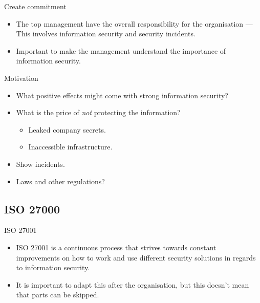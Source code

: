 \documentclass{beamer}
\begin{document}
\begin{frame}{Create commitment}
  \begin{itemize}
    \item The top management have the overall responsibility for the
      organisation --- This involves information security and security incidents.
    \item Important to make the management understand the importance of
      information security.
  \end{itemize}
\end{frame}

\begin{frame}{Motivation}
  \begin{itemize}
    \item What positive effects might come with strong information security?
    \item What is the price of \emph{not} protecting the information?
      \begin{itemize}
        \item Leaked company secrets.
        \item Inaccessible infrastructure.
      \end{itemize}
    \item Show incidents.
    \item Laws and other regulations?
  \end{itemize}
\end{frame}

\subsection{ISO 27000}
\begin{frame}{ISO 27001}
  \begin{itemize}
    \item ISO 27001 is a continuous process that strives towards constant
      improvements on how to work and use different security solutions in
      regards to information security.
    \item It is important to adapt this after the organisation, but this doesn't
      mean that parts can be skipped.
  \end{itemize}
\end{frame}
\end{document}
